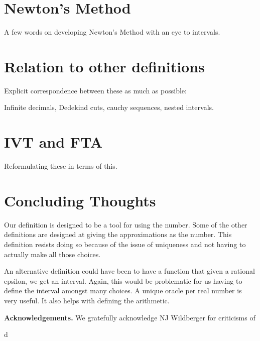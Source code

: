 \documentclass[12pt]{article}
\begin{document}
\section{Newton's Method}

A few words on developing Newton's Method with an eye to intervals. 

\section{Relation to other definitions}

Explicit correspondence between these as much as possible: 

Infinite decimals, Dedekind cuts, cauchy sequences, nested intervals. 

\section{IVT and FTA}

Reformulating these in terms of this. 


\section{Concluding Thoughts}

Our definition is designed to be a tool for using the number. Some of the other definitions are designed at giving the approximations as the number. This definition resists doing so because of the issue of uniqueness and not having to actually make all those choices. 

An alternative definition could have been to have a function that given a rational epsilon, we get an interval. Again, this would be problematic for us having to define the interval amongst many choices. A unique oracle per real number is very useful. It also helps with defining the arithmetic. 



\bigskip

\noindent \textbf{Acknowledgements. } We gratefully acknowledge NJ Wildberger for criticisms of 

\begin{thebibliography}{28.}
d

\end{thebibliography}
\end{document}
